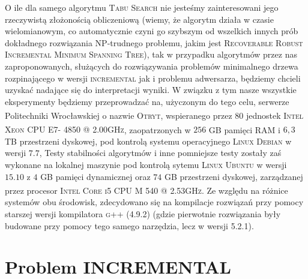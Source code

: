 O ile dla samego algorytmu \textsc{Tabu Search} nie jesteśmy zainteresowani jego rzeczywistą złożonością obliczeniową (wiemy, że algorytm działa w czasie wielomianowym, co automatycznie czyni go szybszym od wszelkich innych prób dokładnego rozwiązania \textsc{NP}-trudnego problemu, jakim jest \textsc{Recoverable Robust Incremental Minimum Spanning Tree}), tak w przypadku algorytmów przez nas zaproponowanych, służących do rozwiązywania problemów minimalnego drzewa rozpinającego w wersji \textsc{incremental} jak i problemu adwersarza, będziemy chcieli uzyskać nadające się do interpretacji wyniki. W związku z tym nasze wszystkie eksperymenty będziemy przeprowadzać na, użyczonym do tego celu, serwerze Politechniki Wrocławskiej o nazwie \textsc{Otryt}, wspieranego przez $80$ jednostek \textsc{Intel\textsuperscript{\textregistered} Xeon\textsuperscript{\textregistered} CPU E7- 4850  @ 2.00GHz}, zaopatrzonych w $256$ \textsc{GB} pamięci \textsc{RAM} i $6,3$ \textsc{TB} przestrzeni dyskowej, pod kontrolą systemu operacyjnego \textsc{Linux Debian} w wersji $7.7$,
Testy stabilności algorytmów i inne pomniejsze testy zostały zaś wykonane na lokalnej maszynie pod kontrolą sytemu \textsc{Linux Ubuntu} w wersji $15.10$ z $4$ \textsc{GB} pamięci dynamicznej oraz $74$ \textsc{GB} przestrzeni dyskowej, zarządzanej przez procesor \textsc{Intel\textsuperscript{\textregistered} Core\textsuperscript{\texttrademark} i5 CPU M 540  @ 2.53GHz}. Ze względu na różnice systemów obu środowisk, zdecydowano się na kompilacje rozwiązań przy pomocy starszej wersji kompilatora \textsc{g++} (\textsc{4.9.2}) (gdzie pierwotnie rozwiązania były budowane przy pomocy tego samego narzędzia, lecz w wersji \textsc{5.2.1}).

\section{Problem INCREMENTAL}

